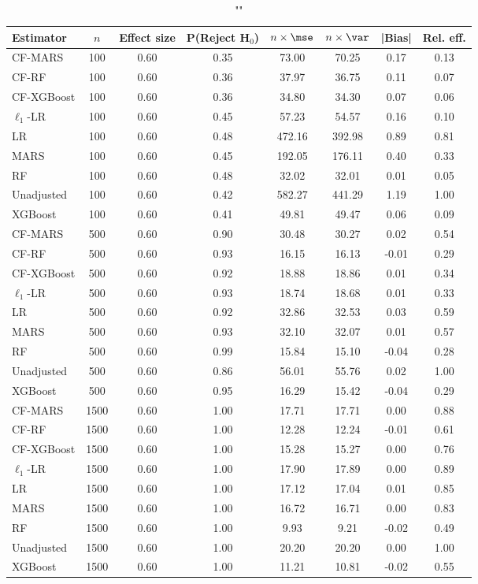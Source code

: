 \begin{table}
\centering
\caption{""}
\begin{tabular}{lccccccc}
\toprule
Estimator & $n$ & Effect size & P(Reject H$_0$) & $n\times\mse$ & $n\times \var$ & |Bias| & Rel. eff.\\ \midrule
CF-MARS & 100 & 0.60 & 0.35 &  73.00 &  70.25 &  0.17 & 0.13 \\ 
CF-RF & 100 & 0.60 & 0.36 &  37.97 &  36.75 &  0.11 & 0.07 \\ 
CF-XGBoost & 100 & 0.60 & 0.36 &  34.80 &  34.30 &  0.07 & 0.06 \\ 
$\ell_1$-LR & 100 & 0.60 & 0.45 &  57.23 &  54.57 &  0.16 & 0.10 \\ 
LR & 100 & 0.60 & 0.48 & 472.16 & 392.98 &  0.89 & 0.81 \\ 
MARS & 100 & 0.60 & 0.45 & 192.05 & 176.11 &  0.40 & 0.33 \\ 
RF & 100 & 0.60 & 0.48 &  32.02 &  32.01 &  0.01 & 0.05 \\ 
Unadjusted & 100 & 0.60 & 0.42 & 582.27 & 441.29 &  1.19 & 1.00 \\ 
XGBoost & 100 & 0.60 & 0.41 &  49.81 &  49.47 &  0.06 & 0.09 \\ \addlinespace 
CF-MARS & 500 & 0.60 & 0.90 &  30.48 &  30.27 &  0.02 & 0.54 \\ 
CF-RF & 500 & 0.60 & 0.93 &  16.15 &  16.13 & -0.01 & 0.29 \\ 
CF-XGBoost & 500 & 0.60 & 0.92 &  18.88 &  18.86 &  0.01 & 0.34 \\ 
$\ell_1$-LR & 500 & 0.60 & 0.93 &  18.74 &  18.68 &  0.01 & 0.33 \\ 
LR & 500 & 0.60 & 0.92 &  32.86 &  32.53 &  0.03 & 0.59 \\ 
MARS & 500 & 0.60 & 0.93 &  32.10 &  32.07 &  0.01 & 0.57 \\ 
RF & 500 & 0.60 & 0.99 &  15.84 &  15.10 & -0.04 & 0.28 \\ 
Unadjusted & 500 & 0.60 & 0.86 &  56.01 &  55.76 &  0.02 & 1.00 \\ 
XGBoost & 500 & 0.60 & 0.95 &  16.29 &  15.42 & -0.04 & 0.29 \\ \addlinespace 
CF-MARS & 1500 & 0.60 & 1.00 &  17.71 &  17.71 &  0.00 & 0.88 \\ 
CF-RF & 1500 & 0.60 & 1.00 &  12.28 &  12.24 & -0.01 & 0.61 \\ 
CF-XGBoost & 1500 & 0.60 & 1.00 &  15.28 &  15.27 &  0.00 & 0.76 \\ 
$\ell_1$-LR & 1500 & 0.60 & 1.00 &  17.90 &  17.89 &  0.00 & 0.89 \\ 
LR & 1500 & 0.60 & 1.00 &  17.12 &  17.04 &  0.01 & 0.85 \\ 
MARS & 1500 & 0.60 & 1.00 &  16.72 &  16.71 &  0.00 & 0.83 \\ 
RF & 1500 & 0.60 & 1.00 &   9.93 &   9.21 & -0.02 & 0.49 \\ 
Unadjusted & 1500 & 0.60 & 1.00 &  20.20 &  20.20 &  0.00 & 1.00 \\ 
XGBoost & 1500 & 0.60 & 1.00 &  11.21 &  10.81 & -0.02 & 0.55 \\
\bottomrule
\end{tabular}
\end{table}

